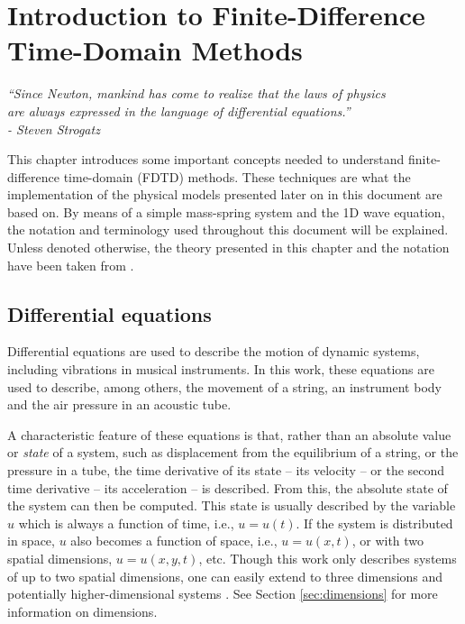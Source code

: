 \chapter{Introduction to Finite-Difference Time-Domain Methods}\label{ch:FDTD}

\begin{flushright}{\it
``Since Newton, mankind has come to realize that the laws of physics\\
are always expressed in the language of differential equations.''\\
- Steven Strogatz} %
\end{flushright}
%
\vspace{2em}
This chapter introduces some important concepts needed to understand finite-difference time-domain (FDTD) methods. These techniques are what the implementation of the physical models presented later on in this document are based on. 
By means of a simple mass-spring system and the 1D wave equation, the notation and terminology used throughout this document will be explained. 
Unless denoted otherwise, the theory presented in this chapter and the notation have been taken from \cite{theBible}. %

\section{Differential equations}\label{sec:differentialEquations}
Differential equations are used to describe the motion of dynamic systems, including vibrations in musical instruments. In this work, these equations are used to describe, among others, the movement of a string, an instrument body and the air pressure in an acoustic tube.

A characteristic feature of these equations is that, rather than an absolute value or \textit{state} of a system, such as displacement from the equilibrium of a string, or the pressure in a tube, the time derivative of its state -- its velocity -- or the second time derivative -- its acceleration -- is described. From this, the absolute state of the system can then be computed.
%
This state is usually described by the variable $u$ which is always a function of time, i.e., $u=u(t)$. If the system is distributed in space, $u$ also becomes a function of space, i.e., $u = u(x,t)$, or with two spatial dimensions, $u = u(x,y,t)$, etc. Though this work only describes systems of up to two spatial dimensions, one can easily extend to three dimensions \cite{Hamilton2016} and potentially higher-dimensional systems%
. See Section \ref{sec:dimensions} for more information on dimensions.


